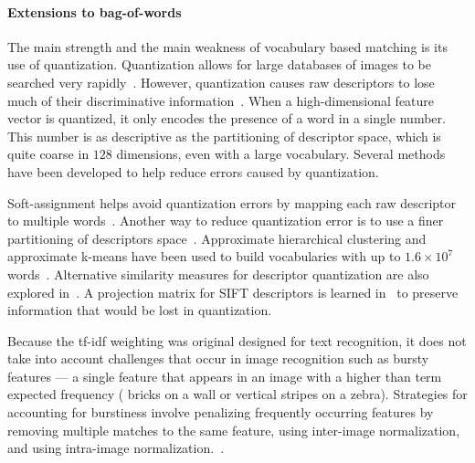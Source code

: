         \paragraph{Extensions to bag-of-words}
            The main strength and the main weakness of vocabulary based matching is its use of quantization.
            Quantization allows for large databases of images to be searched very
            rapidly~\cite{nister_scalable_2006}. However, quantization causes raw descriptors to lose much of their
            discriminative information~\cite{philbin_lost_2008, boiman_defense_2008}. When a high-dimensional
            feature vector is quantized, it only encodes the presence of a word in a single number. This number is
            as descriptive as the partitioning of descriptor space, which is quite coarse in $128$ dimensions, even
            with a large vocabulary. Several methods have been developed to help reduce errors caused by
            quantization.

            Soft-assignment helps avoid quantization errors by mapping each raw descriptor to multiple
            words~\cite{philbin_lost_2008}. Another way to reduce quantization error is to use a finer partitioning
            of descriptors space~\cite{philbin_object_2007}. Approximate hierarchical clustering and approximate
            k-means have been used to build vocabularies with up to $1.6 \times 10^7$
            words~\cite{nister_scalable_2006, philbin_object_2007, mikulik_learning_2010}. Alternative similarity
            measures for descriptor quantization are also explored in~\cite{mikulik_learning_2010}. A projection
            matrix for SIFT descriptors is learned in~\cite{philbin_descriptor_2010} to preserve information that
            would be lost in quantization.

            Because the tf-idf weighting was original designed for text recognition, it does not take into account
            challenges that occur in image recognition such as bursty features --- a single feature that appears in
            an image with a higher than term expected frequency (\eg{} bricks on a wall or vertical stripes on a
            zebra). Strategies for accounting for burstiness involve penalizing frequently occurring features by
            removing multiple matches to the same feature, using inter-image normalization, and using intra-image
            normalization.~\cite{jegou_burstiness_2009}.
            
